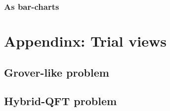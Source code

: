 \documentclass{article}
\newcommand{\SYSHASH}{628f56}
\newcommand{\TAG}{1003}
\newcommand{\bmimage}[1]{
    \begin{center}
    
    \end{center}}
\begin{document}
\bmimage{variational_compile_adjoint_lineplot}

\bmimage{variational_compile_backprop_lineplot}

\bmimage{variational_compile_finitediff_lineplot}

\bmimage{variational_compile_parametershift_lineplot}

\pagebreak

\bmimage{variational_runtime_adjoint_lineplot}

\bmimage{variational_runtime_backprop_lineplot}

\bmimage{variational_runtime_finitediff_lineplot}

\bmimage{variational_runtime_parametershift_lineplot}

\pagebreak
\subsubsection{As bar-charts}

\bmimage{variational_runtime_adjoint}

\bmimage{variational_runtime_backprop}

\bmimage{variational_runtime_finitediff}

\bmimage{variational_runtime_parametershift}

\pagebreak
\section{Appendinx: Trial views}

\subsection{Grover-like problem}
\bmimage{regular_grover_compile_trial}

\bmimage{regular_grover_runtime_trial}

\bmimage{deep_grover_compile_trial}

\bmimage{deep_grover_runtime_trial}

\subsection{Hybrid-QFT problem}

\bmimage{regular_qfth_compile_trial}

\bmimage{regular_qfth_runtime_trial}

\bmimage{deep_qfth_compile_trial}

\bmimage{deep_qfth_runtime_trial}
\end{document}

